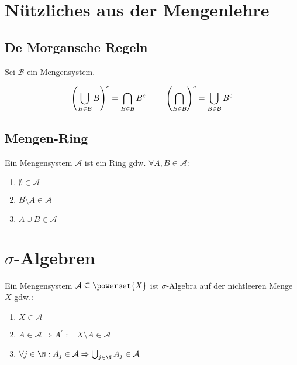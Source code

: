 \newcommand{\A}{\mathcal{A}}
\newcommand{\B}{\mathcal{B}}
\renewcommand{\C}{\mathcal{C}}
\newcommand{\E}{\mathcal{E}}
\newcommand{\F}{\mathcal{F}}
\renewcommand{\L}{\mathcal{L}}

\newcommand{\1}{\mathbbm{1}}

\section*{Nützliches aus der Mengenlehre}

\subsection*{De Morgansche Regeln}

Sei $\B$ ein Mengensystem.

\[ \left(\bigcup_{B\in \B} B \right)^c = \bigcap_{B\in \B} B^c \hspace*{8mm} \left(\bigcap_{B\in \B} \right)^c = \bigcup_{B\in \B} B^c \]

\subsection*{Mengen-Ring}

Ein Mengensystem $\A$ ist ein Ring gdw. $\forall A, B \in \A$:

\begin{enumerate}[label=(\alph*)]
	\item $\emptyset \in \A$
	\item $B\setminus A \in \A$
	\item $A \cup B \in \A$
\end{enumerate}

\section*{$\sigma$-Algebren}

Ein Mengensystem $\A \subseteq \powerset{X}$ ist $\sigma$-Algebra auf der nichtleeren Menge $X$ gdw.:

\begin{enumerate}[label=(\alph*)]
	\item $X \in \A$
	\item $A \in \A \Rightarrow A^c := X\setminus A \in \A$
	\item $\forall j \in \N : A_j \in \A \Rightarrow \bigcup_{j\in \N} A_j \in \A$
\end{enumerate}

